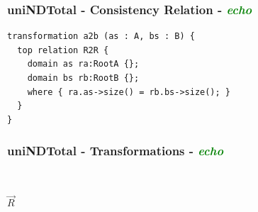 \documentclass{beamer}
\begin{document}
\begin{frame}[fragile]
\frametitle{uniNDTotal - \textbf{Consistency Relation} - \textbf{\textit{\textcolor{green}{echo}}}}

\begin{lstlisting}[language=QVT]
transformation a2b (as : A, bs : B) {
  top relation R2R { 
    domain as ra:RootA {};
    domain bs rb:RootB {};
    where { ra.as->size() = rb.bs->size(); }
  }
}
\end{lstlisting}



\end{frame}


\begin{frame}
\frametitle{uniNDTotal - \textbf{Transformations} - \textbf{\textit{\textcolor{green}{echo}}}}
\begin{figure}[ht]
\begin{mdframed}
    \centering
    \mbox{\qquad\qquad\qquad
          }
\end{mdframed}          
    \label{fig:T1}
\end{figure}

\begin{center}
$\overrightarrow{R}$
\end{center}

\begin{figure}[ht]
    \centering
    \mbox{
          }
    \label{fig:T1}
\end{figure}


\end{frame}
\end{document}
